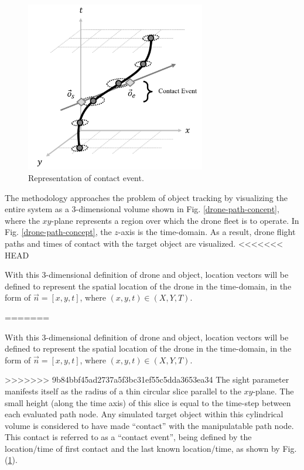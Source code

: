 \documentclass[conf]{new-aiaa}
\begin{document}
\begin{figure}[hbt!]
\centering
\includegraphics[width=0.7\textwidth]{figs/contact-event-concept}
\caption{Representation of contact event.}
\label{contact-event-concept}
\end{figure}

The methodology approaches the problem of object tracking by visualizing the entire system as a 3-dimensional volume shown in Fig. \ref{drone-path-concept}, where the $xy$-plane represents a region over which the drone fleet is to operate. In Fig. \ref{drone-path-concept}, the $z$-axis is the time-domain. As a result, drone flight paths and times of contact with the target object are visualized. 
<<<<<<< HEAD

With this 3-dimensional definition of drone and object, location vectors will be defined to represent the spatial location of the drone in the time-domain, in the form of $\vec{n}=[x, y, t]$, where $(x, y, t) \in (X, Y, T)$.

=======

With this 3-dimensional definition of drone and object, location vectors will be defined to represent the spatial location of the drone in the time-domain, in the form of $\vec{n}=[x, y, t]$, where $(x, y, t) \in (X, Y, T)$.

>>>>>>> 9b84bbf45ad2737a5f3bc31ef55c5dda3653ea34
The sight parameter manifests itself as the radius of a thin circular slice parallel to the $xy$-plane. The small height (along the time axis) of this slice is equal to the time-step between each evaluated path node. Any simulated target object within this cylindrical volume is considered to have made ``contact'' with the manipulatable path node. This contact is referred to as a ``contact event'', being defined by the location/time of first contact and the last known location/time, as shown by Fig. (\ref{contact-event-concept}).
\end{document}
